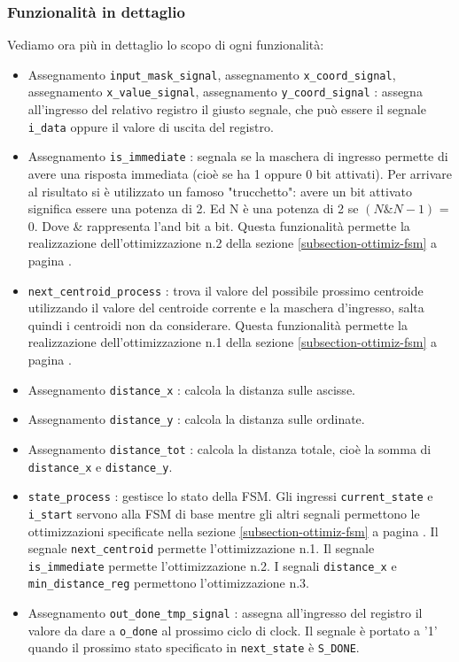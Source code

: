 \documentclass{article}
\begin{document}
\subsubsection{Funzionalità in dettaglio}
Vediamo ora più in dettaglio lo scopo di ogni funzionalità:
\begin{itemize}
    \item Assegnamento \verb^input_mask_signal^, assegnamento \verb^x_coord_signal^, assegnamento \verb^x_value_signal^, assegnamento \verb^y_coord_signal^ : assegna all'ingresso del relativo registro il giusto segnale, che può essere il segnale \verb^i_data^ oppure il valore di uscita del registro.
    \item Assegnamento \verb^is_immediate^ : segnala se la maschera di ingresso permette di avere una risposta immediata (cioè se ha 1 oppure 0 bit attivati). Per arrivare al risultato si è utilizzato un famoso "trucchetto": avere un bit attivato significa essere una potenza di 2. Ed N è una potenza di 2 se \((N \& N-1)\) = 0. Dove \& rappresenta l'and bit a bit. Questa funzionalità permette la realizzazione dell'ottimizzazione n.2 della sezione \ref{subsection-ottimiz-fsm} a pagina \pageref{subsection-ottimiz-fsm}.
    \item \verb^next_centroid_process^ : trova il valore del possibile prossimo centroide utilizzando il valore del centroide corrente e la maschera d'ingresso, salta quindi i centroidi non da considerare. Questa funzionalità permette la realizzazione dell'ottimizzazione n.1 della sezione \ref{subsection-ottimiz-fsm} a pagina \pageref{subsection-ottimiz-fsm}.
    \item Assegnamento \verb^distance_x^ : calcola la distanza sulle ascisse.
    \item Assegnamento \verb^distance_y^ : calcola la distanza sulle ordinate.
    \item Assegnamento \verb^distance_tot^ : calcola la distanza totale, cioè la somma di \verb^distance_x^ e \verb^distance_y^.
    \item \verb^state_process^ : gestisce lo stato della FSM. Gli ingressi \verb^current_state^ e \verb^i_start^ servono alla FSM di base mentre gli altri segnali permettono le ottimizzazioni specificate nella sezione \ref{subsection-ottimiz-fsm} a pagina \pageref{subsection-ottimiz-fsm}. Il segnale \verb^next_centroid^ permette l'ottimizzazione n.1. Il segnale \verb^is_immediate^ permette l'ottimizzazione n.2. I segnali \verb^distance_x^ e \verb^min_distance_reg^ permettono l'ottimizzazione n.3.
    \item Assegnamento \verb^out_done_tmp_signal^ : assegna all'ingresso del registro il valore da dare a \verb^o_done^ al prossimo ciclo di clock. Il segnale è portato a '1' quando il prossimo stato specificato in \verb^next_state^ è \verb^S_DONE^.

\end{itemize}
\end{document}
